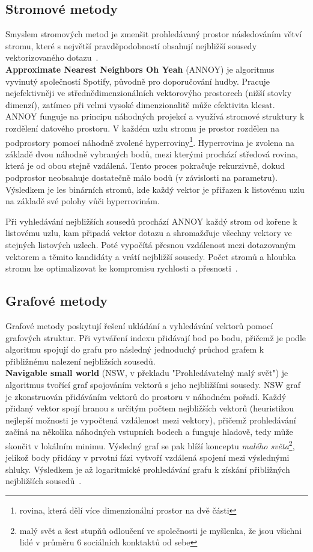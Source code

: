 \subsection{Stromové metody}
Smyslem stromových metod je zmenšit prohledávaný prostor následováním větví stromu, které s největší pravděpodobností obsahují nejbližší sousedy vektorizovaného dotazu~\cite{compreh_survey_vdb}. \\

\textbf{Approximate Nearest Neighbors Oh Yeah} (ANNOY) je algoritmus vyvinutý společností Spotify, původně pro doporučování hudby. Pracuje nejefektivněji ve střednědimenzionálních vektorovýho prostorech (nižší stovky dimenzí), zatímco při velmi vysoké dimenzionalitě může efektivita klesat. ANNOY funguje na principu náhodných projekcí a využívá stromové struktury k rozdělení datového prostoru. V každém uzlu stromu je prostor rozdělen na podprostory pomocí náhodně zvolené hyperroviny\footnote{rovina, která dělí více dimenzionální prostor na dvě části}. Hyperrovina je zvolena na základě dvou náhodně vybraných bodů, mezi kterými prochází středová rovina, která je od obou stejně vzdálená. Tento proces pokračuje rekurzivně, dokud podprostor neobsahuje dostatečně málo bodů (v závislosti na parametru). Výsledkem je les binárních stromů, kde každý vektor je přiřazen k listovému uzlu na základě své polohy vůči hyperrovinám.

Při vyhledávání nejbližších sousedů prochází ANNOY každý strom od kořene k listovému uzlu, kam připadá vektor dotazu a shromažďuje všechny vektory ve stejných listových uzlech. Poté vypočítá přesnou vzdálenost mezi dotazovaným vektorem a těmito kandidáty a vrátí nejbližší sousedy. Počet stromů a hloubka stromu lze optimalizovat ke kompromisu rychlosti a přesnosti~\cite{compreh_survey_vdb, annoy}.


\subsection{Grafové metody}
\label{grafove metody}
Grafové metody poskytují řešení ukládání a vyhledávání vektorů pomocí grafových struktur. Při vytváření indexu přidávají bod po bodu, přičemž je podle algoritmu spojují do grafu pro následný jednoduchý průchod grafem k přibližnému nalezení nejbližsích sousedů. \\

\textbf{Navigable small world} (NSW, v překladu "Prohledávatelný malý svět") je algoritmus tvořící graf spojováním vektorů s jeho nejbližšími sousedy. NSW graf je zkonstruován přidáváním vektorů do prostoru v náhodném pořadí. Každý přidaný vektor spojí hranou s určitým počtem nejbližších vektorů (heuristikou nejlepší možnosti je vypočtená vzdálenost mezi vektory), přičemž prohledávání začíná na několika náhodných vstupních bodech a funguje hladově, tedy může skončit v lokálním minimu. Výsledný graf se pak blíží konceptu \textit{malého světa}\footnote{malý svět a šest stupňů odloučení ve společnosti je myšlenka, že jsou všichni lidé v průměru 6 sociálních konktaktů od sebe}, jelikož body přidány v prvotní fázi vytvoří vzdálená spojení mezi výslednými shluky. Výsledkem je až logaritmické prohledávání grafu k získání přibližných nejbližších sousedů~\cite{hnsw}. \\

